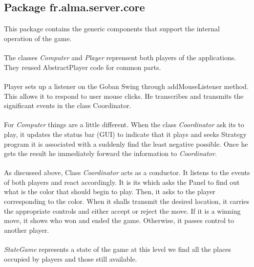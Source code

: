 \documentclass[a4paper,12pt]{report}
\begin{document}
      \subsection{Package fr.alma.server.core}
	  \paragraph*{}
	  This package contains the generic components that support the internal operation of the game.
	  \paragraph*{}
	  The classes \textit{Computer} and \textit{Player} reprensent both players of the applications. They reused AbstractPlayer code for common parts.
	  \paragraph*{}
	  Player sets up a listener on the Goban Swing through addMouseListener method. This allows it to respond to user mouse clicks. 
	  He transcribes and transmits the significant events in the class Coordinator.
	  \paragraph*{}
	  For \textit{Computer} things are a little different. When the class \textit{Coordinator} ask its to play, it updates the status bar (GUI) to indicate that it plays and seeks Strategy program it is associated with a suddenly find the least negative possible. 
	  Once he gets the result he immediately forward the information to \textit{Coordinator}.
	  \paragraph*{}
	  As discussed above, Class \textit{Coordinator} acts as a conductor. It listens to the events of both players and react accordingly. 
	  It is its which asks the Panel to find out what is the color that should begin to play. Then, it asks to the player corresponding to the color. 
	  When it shalls transmit the desired location, it carries the appropriate controls and either accept or reject the move. 
	  If it is a winning move, it shows who won and ended the game. Otherwise, it passes control to another player.
	  \paragraph*{}
	  \textit{StateGame} represents a state of the game at this level we find all the places occupied by players and those still available.
\end{document}
